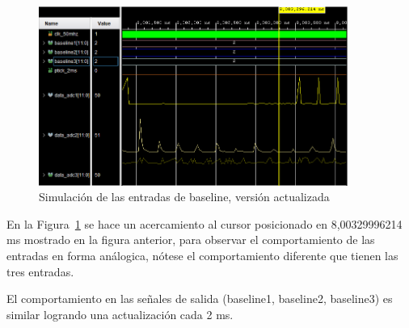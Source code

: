 \begin{figure}[H]
\includegraphics[width=0.9\textwidth]{Figs/zombasenue.PNG} 
\centering
\caption{Simulación de las entradas de baseline, versión actualizada}
\label{finbase}
\end{figure}

En la  Figura~\ref{finbase} se hace un acercamiento al cursor posicionado en 8,00329996214~ ms mostrado en la figura anterior, para observar el comportamiento de las entradas en forma análogica, nótese el  comportamiento diferente que tienen las tres entradas.



El comportamiento en las señales de salida (baseline1, baseline2, baseline3) es similar logrando una actualización cada 2 ms.




 
